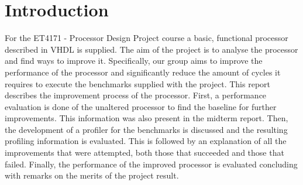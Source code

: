 \documentclass[final]{article}
\begin{document}
\section{Introduction}
For the ET4171 - Processor Design Project course a basic, functional processor described in VHDL is supplied. The aim of the project is to analyse the processor and find ways to improve it. Specifically, our group aims to improve the performance of the processor and significantly reduce the amount of cycles it requires to execute the benchmarks supplied with the project. This report describes the improvement process of the processor. First, a performance evaluation is done of the unaltered processor to find the baseline for further improvements. This information was also present in the midterm report. Then, the development of a profiler for the benchmarks is discussed and the resulting profiling information is evaluated. This is followed by an explanation of all the improvements that were attempted, both those that succeeded and those that failed. Finally, the performance of the improved processor is evaluated concluding with remarks on the merits of the project result.
\end{document}
